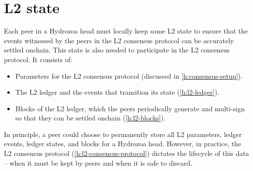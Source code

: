 \documentclass[../hydrozoa.tex]{subfiles}
\begin{document}
\chapter{L2 state}%
\label{h:l2-state}

Each peer in a Hydrozoa head must locally keep some L2 state to ensure that the events witnessed by the peers in the L2 consensus protocol can be accurately settled onchain.
This state is also needed to participate in the L2 consensus protocol.
It consists of:
\begin{itemize}
  \item Parameters for the L2 consensus protocol (discussed in \cref{h:consensus-setup}).
  \item The L2 ledger and the events that transition its state (\cref{h:l2-ledger}).
  \item Blocks of the L2 ledger, which the peers periodically generate and multi-sign so that they can be settled onchain (\cref{h:l2-blocks}).
\end{itemize}

In principle, a peer could choose to permanently store all L2 parameters, ledger events, ledger states, and blocks for a Hydrozoa head.
However, in practice, the L2 consensus protocol (\cref{h:l2-consensus-protocol}) dictates the lifecycle of this data -- when it must be kept by peers and when it is safe to discard.
\end{document}
